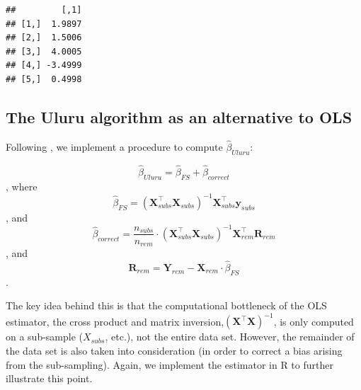 \documentclass[
  12pt,
]{style/krantz}
\begin{document}
\begin{verbatim}
##         [,1]
## [1,]  1.9897
## [2,]  1.5006
## [3,]  4.0005
## [4,] -3.4999
## [5,]  0.4998
\end{verbatim}

\hypertarget{the-uluru-algorithm-as-an-alternative-to-ols}{%
\subsection{The Uluru algorithm as an alternative to OLS}\label{the-uluru-algorithm-as-an-alternative-to-ols}}

Following \citet{dhillon_2013}, we implement a procedure to compute \(\hat{\beta}_{Uluru}\):

\[\hat{\beta}_{Uluru}=\hat{\beta}_{FS} + \hat{\beta}_{correct}\], where
\[\hat{\beta}_{FS} = (\mathbf{X}_{subs}^\intercal\mathbf{X}_{subs})^{-1}\mathbf{X}_{subs}^{\intercal}\mathbf{y}_{subs}\], and
\[\hat{\beta}_{correct}= \frac{n_{subs}}{n_{rem}} \cdot (\mathbf{X}_{subs}^\intercal\mathbf{X}_{subs})^{-1} \mathbf{X}_{rem}^{\intercal}\mathbf{R}_{rem}\], and
\[\mathbf{R}_{rem} = \mathbf{Y}_{rem} - \mathbf{X}_{rem}  \cdot \hat{\beta}_{FS}\].

The key idea behind this is that the computational bottleneck of the OLS estimator, the cross product and matrix inversion,\((\mathbf{X}^\intercal\mathbf{X})^{-1}\), is only computed on a sub-sample (\(X_{subs}\), etc.), not the entire data set. However, the remainder of the data set is also taken into consideration (in order to correct a bias arising from the sub-sampling). Again, we implement the estimator in R to further illustrate this point.
\end{document}
